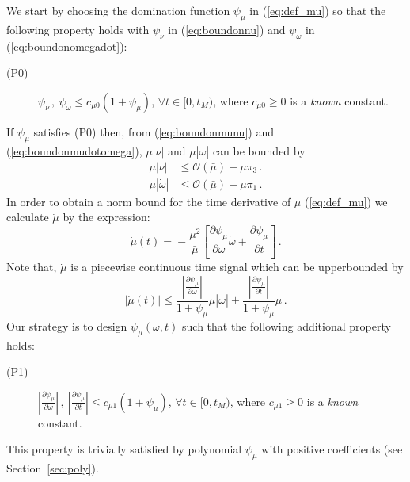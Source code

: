 \documentclass{rncauth}
\begin{document}
We start by choosing the domination function $\psi_\mu$ in
(\ref{eq:def_mu}) so that the following property holds with
$\psi_\nu$ in (\ref{eq:boundonnu}) and $\psi_\omega$ in
(\ref{eq:boundonomegadot}):
%
\begin{description}
\item[(P0)] $\psi_\nu\,, \
\psi_\omega \leq c_{\mu 0}(1+\psi_\mu)$, $\forall t \in [0,t_M)$,
where $c_{\mu 0}\geq 0$ is a {\em known} constant.
\end{description}
%
If  $\psi_\mu$ satisfies (P0) then, from (\ref{eq:boundonmunu})
and (\ref{eq:boundonmudotomega}), $\mu|\nu|$ and
$\mu|\dot{\omega}|$ can be bounded by
%
\begin{align}
\mu|\nu| &\leq
\mathcal{O}(\bar{\mu})+\mu\pi_3\,.\label{eq:boundonmunu1}\\
\mu|\dot{\omega}| &\leq
\mathcal{O}(\bar{\mu})+\mu\pi_1\,.\label{eq:boundonmudotomega1}
\end{align}
%
In order to obtain a norm bound for the time derivative of $\mu$
(\ref{eq:def_mu}) we calculate $\dot{\mu}$ by the expression:
%
\begin{equation}
\dot{\mu}(t)\!=\!-\frac{\mu^2}{\bar{\mu}} \left[\frac{\partial
\psi_\mu}{\partial \omega} \dot{\omega}+\frac{\partial
\psi_\mu}{\partial t}\right]\,. \label{eq:def_mudot}
\end{equation}
%
Note that, $\dot{\mu}$ is a piecewise continuous time signal which
can be upperbounded by
%
\begin{equation}
|\dot{\mu}(t)|\!\leq\!\frac{\left|\frac{\partial
\psi_\mu}{\partial \omega}\right|}{1+\psi_\mu} \mu
|\dot{\omega}|+\frac{\left|\frac{\partial \psi_\mu}{\partial
t}\right|}{1+\psi_\mu}\mu\,. \label{eq:mudotbound}
\end{equation}
%
Our strategy is to design $\psi_\mu(\omega,t)$ such that the
following additional property holds:
%
\begin{description}
\item[(P1)] $\left|\frac{\partial \psi_\mu}{\partial
\omega}\right|\,, \ \left|\frac{\partial \psi_\mu}{\partial
t}\right|\leq c_{\mu 1}(1+\psi_\mu)$, $\forall t \in [0,t_M)$, where
$c_{\mu 1}\geq 0$ is a {\em known} constant.
\end{description}
%
This property is trivially satisfied by polynomial $\psi_\mu$ with
positive coefficients (see Section~\ref{sec:poly}).
\end{document}
